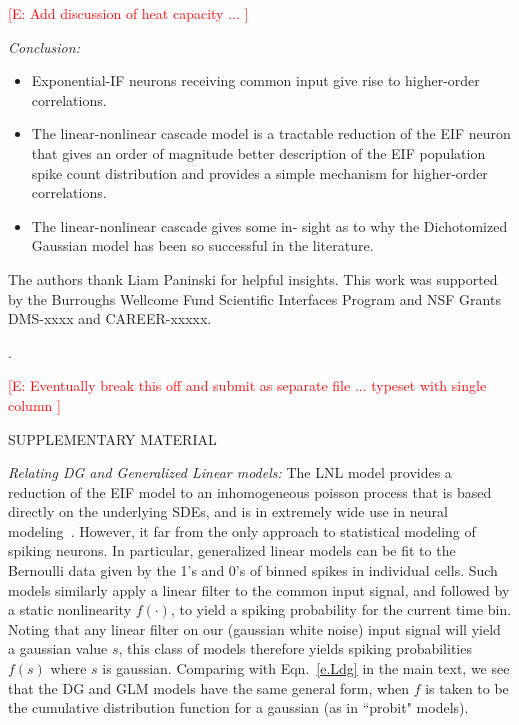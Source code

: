 \documentclass[%
 reprint,
 amsmath,amssymb,
 aps,
floatfix,
]{revtex4-1}
\newcommand{\Ecomment}[1]{\textcolor{red}{[E: #1]}}
\begin{document}
\bigskip

\Ecomment{Add discussion of heat capacity ... }

\bigskip 
{\it Conclusion:}   %
\begin{itemize} \item Exponential-IF neurons receiving common input give rise to higher-order correlations.
\item {The linear-nonlinear cascade model is a tractable reduction of the EIF neuron that gives an order of magnitude better description of the EIF population spike count distribution and provides a simple mechanism for higher-order correlations.}
\item The linear-nonlinear cascade gives some in- sight as to why the Dichotomized Gaussian model has been so successful in the literature.
\end{itemize}

The authors thank Liam Paninski for helpful insights. This work was supported by the Burroughs Wellcome Fund Scientific Interfaces Program and NSF Grants DMS-xxxx and CAREER-xxxxx.  


\newpage
.
\newpage

\Ecomment{Eventually break this off and submit as separate file ... typeset with single column }


\bigskip

SUPPLEMENTARY MATERIAL 

\bigskip


{\it Relating DG and Generalized Linear models:}
The LNL model provides a reduction of the EIF model to an inhomogeneous poisson process that is based directly on the underlying SDEs, and is in extremely wide use in neural modeling~\cite{Abb-Dayan}.  However, it far from the only approach to statistical modeling of spiking neurons.  In particular, generalized linear models can be fit to the Bernoulli data given by the 1's and 0's of binned spikes in individual cells.  Such models similarly apply a linear filter to the common input signal, and followed by a static nonlinearity $f(\cdot)$, to yield a spiking probability for the current time bin.  Noting that any linear filter on our (gaussian white noise) input signal will yield a gaussian value $s$, this class of models therefore yields spiking probabilities $f(s)$ where $s$ is gaussian.  Comparing with Eqn.~\eqref{e.Ldg} in the main text, we see that the DG and GLM models have the same general form, when $f$ is taken to be the cumulative distribution function for a gaussian (as in ``probit" models). 
\end{document}
